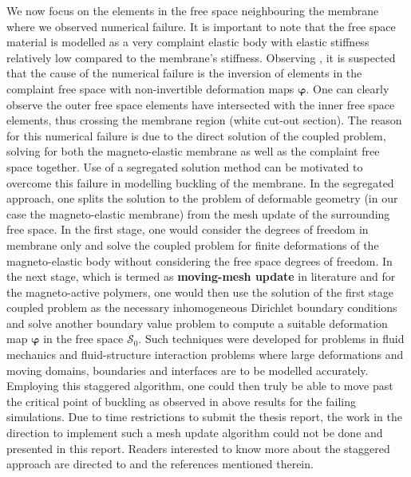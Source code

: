 \documentclass[11pt,a4paper,final]{article}
\begin{document}
We now focus on the elements in the free space neighbouring the membrane where we observed numerical failure. It is important to note that the free space material is modelled as a very complaint elastic body with elastic stiffness relatively low compared to the membrane's stiffness. Observing , it is suspected that the cause of the numerical failure is the inversion of elements in the complaint free space with non-invertible deformation maps $\bm{\varphi}$. One can clearly observe the outer free space elements have intersected with the inner free space elements, thus crossing the membrane region (white cut-out section). The reason for this numerical failure is due to the direct solution of the coupled problem, solving for both the magneto-elastic membrane as well as the complaint free space together. Use of a segregated solution method can be motivated to overcome this failure in modelling buckling of the membrane. In the segregated approach, one splits the solution to the problem of deformable geometry (in our case the magneto-elastic membrane) from the mesh update of the surrounding free space. In the first stage, one would consider the degrees of freedom in membrane only and solve the coupled problem for finite deformations of the magneto-elastic body without considering the free space degrees of freedom. In the next stage, which is termed as \textbf{moving-mesh update} in literature \cite{bustamante2011numerical} and \cite{Pelteret2016} for the magneto-active polymers, one would then use the solution of the first stage coupled problem as the necessary inhomogeneous Dirichlet boundary conditions and solve another boundary value problem to compute a suitable deformation map $\bm{\varphi}$ in the free space $\mathcal{S}_0$. Such techniques were developed for problems in fluid mechanics and fluid-structure interaction problems where large deformations and moving domains, boundaries and interfaces are to be modelled accurately. Employing this staggered algorithm, one could then truly be able to move past the critical point of buckling as observed in above results for the failing simulations. Due to time restrictions to submit the thesis report, the work in the direction to implement such a mesh update algorithm could not be done and presented in this report. Readers interested to know more about the staggered approach are directed to \cite[see][Sec. 7]{Pelteret2016} and the references mentioned therein. \par 


\newpage
\printbibliography
\end{document}
